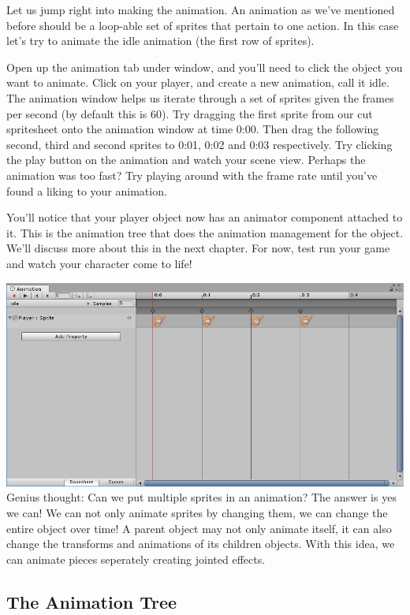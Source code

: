 \documentclass[12pt]{article}
\begin{document}
Let us jump right into making the animation. An animation as we've mentioned before should be a loop-able set of sprites that pertain to one action. In this case let's try to animate the idle animation (the first row of sprites). 

Open up the animation tab under window, and you'll need to click the object you want to animate. Click on your player, and create a new animation, call it idle. The animation window helps us iterate through a set of sprites given the frames per second (by default this is 60). Try dragging the first sprite from our cut spritesheet onto the animation window at time 0:00. Then drag the following second, third and second sprites to 0:01, 0:02 and 0:03 respectively. Try clicking the play button on the animation and watch your scene view. Perhaps the animation was too fast? Try playing around with the frame rate until you've found a liking to your animation.

You'll notice that your player object now has an animator component attached to it. This is the animation tree that does the animation management for the object. We'll discuss more about this in the next chapter. For now, test run your game and watch your character come to life!

\includegraphics[scale=0.6]{Figure0421} \\

Genius thought: Can we put multiple sprites in an animation? The answer is yes we can! We can not only animate sprites by changing them, we can change the entire object over time! A parent object may not only animate itself, it can also change the transforms and animations of its children objects. With this idea, we can animate pieces seperately creating jointed effects.  

\subsection{The Animation Tree}
\end{document}
